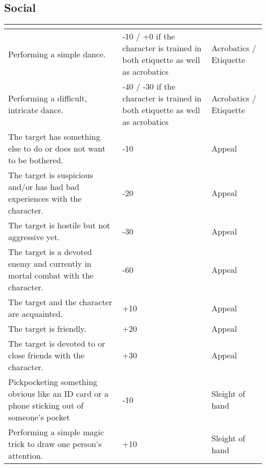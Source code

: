 \documentclass[12pt,a4paper,openany]{book}
\newcommand{\ul}[1]{\underline{\smash{#1}}}
\begin{document}
	\subsection{Social}
	\begin{tabularx}{\textwidth}{|X|X|l|}
		\hline
		\ul{Situation} & \ul{Modifier} & \ul{Focused skill} \\ \hline
		Performing a simple dance. & -10 / +0 if the character is trained in both etiquette as well as acrobatics & Acrobatics / Etiquette \\ \hline
		Performing a difficult, intricate dance. & -40 / -30 if the character is trained in both etiquette as well as acrobatics & Acrobatics / Etiquette \\ \hline
		The target has something else to do or does not want to be bothered. & -10 & Appeal \\ \hline
		The target is suspicious and/or has had bad experiences with the character. & -20 & Appeal \\ \hline
		The target is hostile but not aggressive yet. & -30 & Appeal \\ \hline
		The target is a devoted enemy and currently in mortal combat with the character. & -60 & Appeal \\ \hline
		The target and the character are acquainted. & +10 & Appeal \\ \hline
		The target is friendly. & +20 & Appeal \\ \hline
		The target is devoted to or close friends with the character. & +30 & Appeal \\ \hline
		Pickpocketing something obvious like an ID card or a phone sticking out of someone's pocket & -10 & Sleight of hand \\ \hline
		Performing a simple magic trick to draw one person's attention. & +10 & Sleight of hand \\ \hline
	\end{tabularx}
\end{document}
